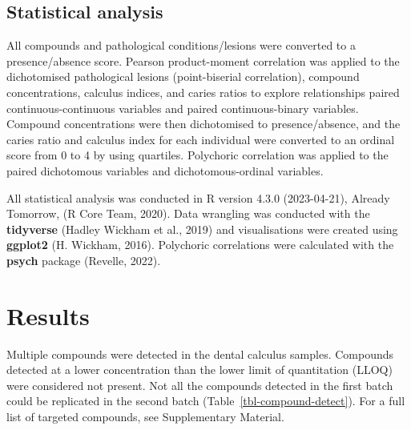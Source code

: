 \documentclass[
  letterpaper,
]{book}
\begin{document}
\hypertarget{statistical-analysis-1}{%
\subsection{Statistical analysis}\label{statistical-analysis-1}}

All compounds and pathological conditions/lesions were converted to a
presence/absence score. Pearson product-moment correlation was applied
to the dichotomised pathological lesions (point-biserial correlation),
compound concentrations, calculus indices, and caries ratios to explore
relationships paired continuous-continuous variables and paired
continuous-binary variables. Compound concentrations were then
dichotomised to presence/absence, and the caries ratio and calculus
index for each individual were converted to an ordinal score from 0 to 4
by using quartiles. Polychoric correlation was applied to the paired
dichotomous variables and dichotomous-ordinal variables.

All statistical analysis was conducted in R version 4.3.0 (2023-04-21),
Already Tomorrow, (R Core Team, 2020). Data wrangling was conducted with
the \textbf{tidyverse} (Hadley Wickham et al., 2019) and visualisations
were created using \textbf{ggplot2} (H. Wickham, 2016). Polychoric
correlations were calculated with the \textbf{psych} package (Revelle,
2022).

\hypertarget{results-1}{%
\section{Results}\label{results-1}}

Multiple compounds were detected in the dental calculus samples.
Compounds detected at a lower concentration than the lower limit of
quantitation (LLOQ) were considered not present. Not all the compounds
detected in the first batch could be replicated in the second batch
(Table~\ref{tbl-compound-detect}). For a full list of targeted
compounds, see Supplementary Material.
\end{document}

